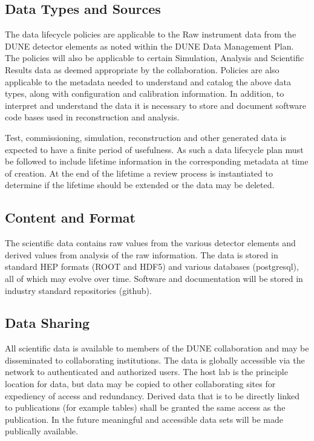 \documentclass[../main-v1.tex]{subfiles}
\begin{document}
\subsection{
 Data Types and Sources}
The data lifecycle policies are applicable to the Raw instrument data from the DUNE detector elements as noted within the DUNE Data Management Plan.  The policies will also be applicable to certain Simulation, Analysis and Scientific Results data as deemed appropriate by the collaboration.  Policies are also applicable to the metadata needed to understand and catalog the above data types, along with configuration and calibration information.  In addition, to interpret and understand the data it is necessary to store and document software code bases used in reconstruction and analysis.

Test, commissioning, simulation, reconstruction and other generated data is expected to have a finite period of usefulness.  As such a data lifecycle plan must be followed to include lifetime information in the corresponding metadata at time of creation.  At the end of the lifetime a review process is instantiated to determine if the lifetime should be extended or the data may be deleted.

\subsection{ Content and Format}
The scientific data contains raw values from the various detector elements and derived values from analysis of the raw information.  The data is stored in standard HEP formats (ROOT and HDF5) and various databases (postgresql), all of which may evolve over time.  Software and documentation will be stored in industry standard repositories (github).

\subsection{ Data Sharing}
All scientific data is available to members of the DUNE collaboration and may be disseminated to collaborating institutions.  The data is globally accessible via the network to authenticated and authorized users.  The host lab is the principle location for data, but data may be copied to other collaborating sites for expediency of access and redundancy.
Derived data that is to be directly linked to publications (for example tables) shall be granted the same access as the publication.  In the future meaningful and accessible data sets will be made publically available.
\end{document}
